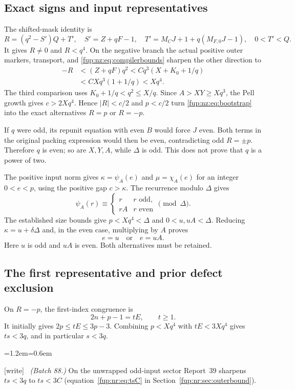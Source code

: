 \documentclass[11pt,letterpaper]{article}
\theoremstyle{definition}\newtheorem{definition}[theorem]{Definition}
\theoremstyle{remark}\newtheorem{remark}[theorem]{Remark}
\newcommand{\MC}{M_C}
\newcommand{\MFnatV}{M_{F,0}}
\newcommand{\wtag}{\textup{[write]}}
\newenvironment{writenote}{\par\smallskip\begin{list}{}{\leftmargin=1.2em\rightmargin=0.6em}\item[]\small\wtag\ }{\end{list}\smallskip}
\begin{document}
\subsection{Exact signs and input representatives}
The shifted-mask identity is
\begin{equation}\label{fup:nz:eq:shifted}
 R=(q^2-S')Q+T',\quad S'=Z+qF-1,\quad
 T'=\MC J+1+q(\MFnatV J-1),\quad 0<T'<Q.
\end{equation}
It gives $R\ne0$ and $R<q^4$. On the negative branch the actual positive outer markers, transport, and \eqref{fup:nz:eq:compilerbounds} sharpen the other direction to
\begin{align}\label{fup:nz:eq:absolute}
 -R&<(Z+qF)q^2<Cq^3(X+K_0+1/q)\nonumber\\
 &<CXq^3(1+1/q)<Xq^4.
\end{align}
The third comparison uses $K_0+1/q<q^2\le X/q$. Since $A>XY\ge Xq^3$, the Pell growth gives $c>2Xq^4$. Hence $|R|<c/2$ and $p<c/2$ turn \eqref{fup:nz:eq:bootstrap} into the exact alternatives $R=p$ or $R=-p$.

If $q$ were odd, its repunit equation with even $B$ would force $J$ even. Both terms in the original packing expression would then be even, contradicting odd $R=\pm p$. Therefore $q$ is even; so are $X,Y,A$, while $\Delta$ is odd. This does not prove that $q$ is a power of two.

The positive input norm gives $\kappa=\psi_A(e)$ and $\mu=\chi_A(e)$ for an integer $0<e<p$, using the positive gap $c>\kappa$. The recurrence modulo $\Delta$ gives
\begin{equation}\label{fup:nz:eq:discriminant}
 \psi_A(r)\equiv
 \begin{cases}r& r\text{ odd},\\rA&r\text{ even}\end{cases}\pmod\Delta.
\end{equation}
The established size bounds give $p<Xq^4<\Delta$ and $0<u,uA<\Delta$. Reducing $\kappa=u+\delta\Delta$ and, in the even case, multiplying by $A$ proves
\begin{equation}\label{fup:nz:eq:twoinput}
 e=u\quad\text{or}\quad e=uA.
\end{equation}
Here $u$ is odd and $uA$ is even. Both alternatives must be retained.

\subsection{The first representative and prior defect exclusion}
On $R=-p$, the first-index congruence is
\begin{equation}\label{fup:nz:eq:representative}
 2n+p-1=tE,\qquad t\ge1.
\end{equation}
It initially gives $2p\le tE\le3p-3$. Combining $p<Xq^4$ with $tE<3Xq^4$ gives $ts<3q$, and in particular $s<3q$.
\begin{writenote}
\emph{(Batch 88.)} On the unwrapped odd-input sector Report~39 sharpens $ts<3q$ to $ts<3C$ (equation~\eqref{fup:nr:eq:tsC} in Section~\ref{fup:nr:sec:outerbound}).
\end{writenote}
\end{document}
